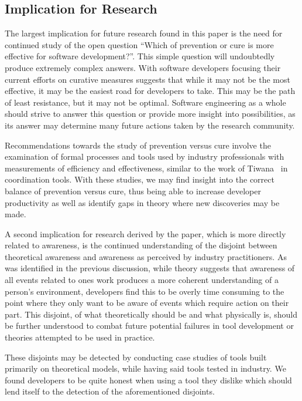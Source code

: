 \documentclass[conference]{IEEEtran}
\begin{document}
\subsection{Implication for Research}
\label{sec:implr}

The largest implication for future research found in this paper is the need for continued study of the open question
``Which of prevention or cure is more effective for software development?''. This simple question will undoubtedly 
produce extremely complex answers. With software developers focusing their current efforts on curative measures suggests
that while it may not be the most effective, it may be the easiest road for developers to take. This may be the path of
least resistance, but it may not be optimal. Software engineering as a whole should strive to answer this question or
provide more insight into possibilities, as its answer may determine many future actions taken by the research community.

Recommendations towards the study of prevention versus cure involve the examination of formal processes and tools used
by industry professionals with measurements of efficiency and effectiveness, similar to the work of
Tiwana~\cite{Tiwana:2008:ICD} in coordination tools. With these studies, we may find insight into the correct balance
of prevention versus cure, thus being able to increase developer productivity as well as identify gaps in theory 
where new discoveries may be made.

A second implication for research derived by the paper, which is more directly related to awareness, is the continued
understanding of the disjoint between theoretical awareness and awareness as perceived by industry practitioners.
As was identified in the previous discussion, while theory suggests that awareness of all events related to ones work
produces a more coherent understanding of a person's environment, developers find this to be overly time consuming
to the point where they only want to be aware of events which require action on their part. This disjoint, of what 
theoretically should be and what physically is, should be further understood to combat future potential failures in
tool development or theories attempted to be used in practice.

These disjoints may be detected by conducting case 
studies of tools built primarily on theoretical models, while having said tools tested in industry. We found developers
to be quite honest when using a tool they dislike which should lend itself to the detection of the aforementioned
disjoints.
\end{document}

